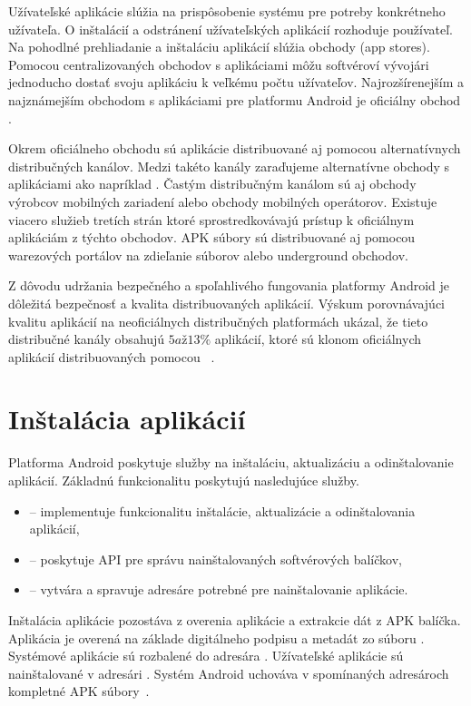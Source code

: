 Užívateľské aplikácie slúžia na prispôsobenie systému pre potreby konkrétneho užívateľa. O inštalácií a odstránení užívateľských aplikácií rozhoduje používateľ. Na pohodlné prehliadanie a inštaláciu aplikácií slúžia obchody (app stores). Pomocou centralizovaných obchodov s aplikáciami môžu softvéroví vývojári jednoducho dostať svoju aplikáciu k veľkému počtu užívateľov.  Najrozšírenejším a najznámejším obchodom s aplikáciami pre platformu Android je oficiálny obchod 
. 

Okrem oficiálneho obchodu sú aplikácie distribuované aj pomocou alternatívnych distribučných kanálov. Medzi takéto kanály zaraďujeme alternatívne obchody s aplikáciami ako napríklad . Častým distribučným kanálom sú aj obchody výrobcov mobilných zariadení alebo obchody mobilných operátorov. Existuje viacero služieb tretích strán ktoré sprostredkovávajú prístup k oficiálnym aplikáciám z týchto obchodov. APK súbory sú distribuované aj pomocou warezových portálov na zdieľanie súborov alebo underground obchodov. 

Z dôvodu udržania bezpečného a spoľahlivého fungovania platformy Android je dôležitá bezpečnosť a kvalita distribuovaných aplikácií. Výskum porovnávajúci kvalitu aplikácií na neoficiálnych distribučných platformách ukázal, že tieto distribučné kanály obsahujú $5 až 13\%$ aplikácií, ktoré sú klonom oficiálnych aplikácií distribuovaných pomocou  ~\cite{Zhou2012}.

\section{Inštalácia aplikácií}

Platforma Android poskytuje služby na inštaláciu, aktualizáciu a odinštalovanie aplikácií. \newline
Základnú funkcionalitu poskytujú nasledujúce služby.
\begin{itemize}
	\item {} -- implementuje funkcionalitu inštalácie, aktualizácie a odinštalovania aplikácií,
	\item {} -- poskytuje API pre správu nainštalovaných softvérových balíčkov,
	\item {} -- vytvára a spravuje adresáre potrebné pre nainštalovanie aplikácie.
\end{itemize}
Inštalácia aplikácie pozostáva z overenia aplikácie a extrakcie dát z APK balíčka. Aplikácia je overená na základe digitálneho podpisu a metadát zo súboru . Systémové aplikácie sú rozbalené do adresára . Užívateľské aplikácie sú nainštalované v adresári . Systém Android uchováva v spomínaných adresároch kompletné APK súbory~\cite{AndroidDeveloper}.

